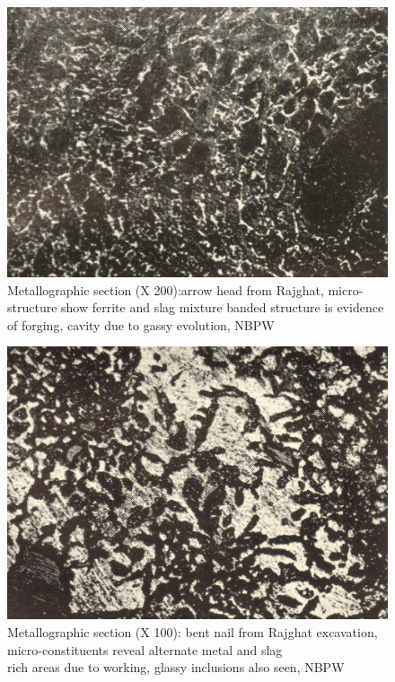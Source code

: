 \begin{figure}[H]
\renewcommand{\thefigure}{24A}
\includegraphics[scale=1]{images/chapter-4/fig024A.jpg}
\caption{Metallographic section (X 200):arrow head from Rajghat, micro-structure show ferrite and slag mixture banded structure is evidence of forging, cavity due to gassy evolution, NBPW}\label{chapter-4-fig24A}
\end{figure}

\newpage

\begin{figure}[H]
\renewcommand{\thefigure}{24B}
\includegraphics[scale=1]{images/chapter-4/fig024B.jpg}
\caption{Metallographic section (X 100): bent nail from Rajghat excavation, micro-constituents reveal alternate metal and slag\\ rich areas due to working, glassy inclusions also seen, NBPW}\label{chapter-4-fig24B}
\end{figure}

